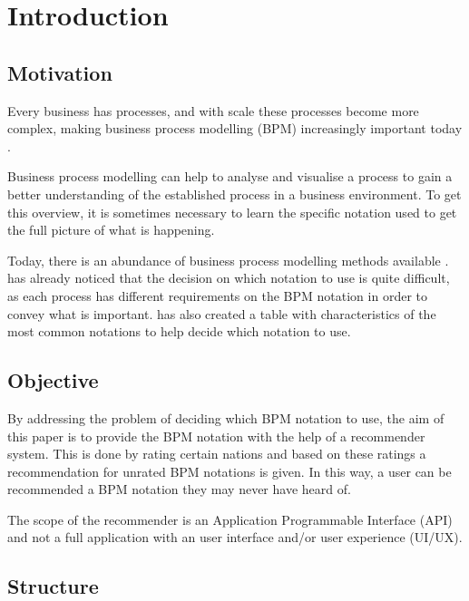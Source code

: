 \chapter{Introduction}

\section{Motivation}

Every business has processes, and with scale these processes become more complex, making business process modelling (BPM) increasingly important today \cite{bpmComparison}.


Business process modelling can help to analyse and visualise a process to gain a better understanding of the established process in a business environment. To get this overview, it is sometimes necessary to learn the specific notation used to get the full picture of what is happening.

Today, there is an abundance of business process modelling methods available \cite{bpm_survey}. \cite{bpm_review_framework} has already noticed that the decision on which notation to use is quite difficult, as each process has different requirements on the BPM notation in order to convey what is important. \cite{bpm_review_framework} has also created a table with characteristics of the most common notations to help decide which notation to use.

\section{Objective}

By addressing the problem of deciding which BPM notation to use, the aim of this paper is to provide the BPM notation with the help of a recommender system. This is done by rating certain nations and based on these ratings a recommendation for unrated BPM notations is given. In this way, a user can be recommended a BPM notation they may never have heard of.

The scope of the recommender is an Application Programmable Interface (API) and not a full application with an user interface and/or user experience (UI/UX). 

\section{Structure}

